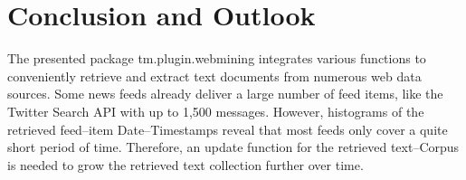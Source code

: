 \documentclass[a4paper]{article}
\newcommand{\class}[1]{\mbox{\textsf{#1}}}
\newcommand{\pkg}[1]{{\normalfont\fontseries{b}\selectfont #1}}
\begin{document}
\section{Conclusion and Outlook}
The presented package \pkg{tm.plugin.webmining} integrates various functions to conveniently
retrieve and extract text documents from numerous web data sources. Some news feeds
already deliver a large number of feed items, like the Twitter Search API with up to 1,500 messages.
However, histograms of the retrieved feed--item Date--Timestamps reveal that most feeds
only cover a quite short period of time. Therefore, an update function for the retrieved
text--\class{Corpus} is needed to grow the retrieved text collection further over time.


%
%


\end{document}

